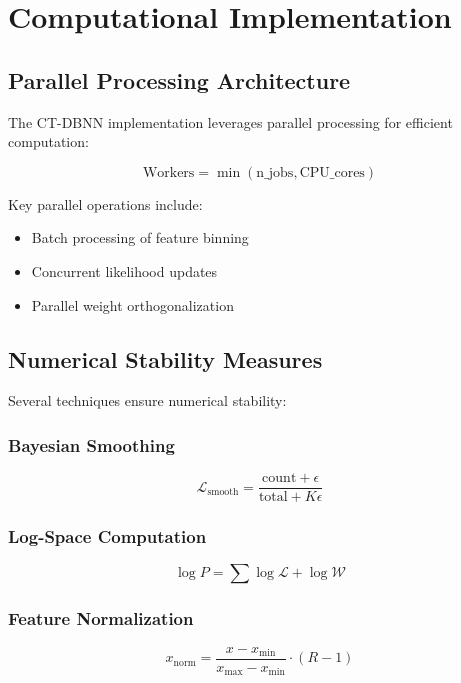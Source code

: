 \documentclass[journal]{IEEEtran}
\begin{document}
\section{Computational Implementation}

\subsection{Parallel Processing Architecture}

The CT-DBNN implementation leverages parallel processing for efficient computation:

\begin{equation}
\text{Workers} = \min(\text{n\_jobs}, \text{CPU\_cores})
\end{equation}

Key parallel operations include:
\begin{itemize}
\item Batch processing of feature binning
\item Concurrent likelihood updates
\item Parallel weight orthogonalization
\end{itemize}

\subsection{Numerical Stability Measures}

Several techniques ensure numerical stability:

\subsubsection{Bayesian Smoothing}
\begin{equation}
\mathcal{L}_{\text{smooth}} = \frac{\text{count} + \epsilon}{\text{total} + K\epsilon}
\end{equation}

\subsubsection{Log-Space Computation}
\begin{equation}
\log P = \sum \log \mathcal{L} + \log \mathcal{W}
\end{equation}

\subsubsection{Feature Normalization}
\begin{equation}
x_{\text{norm}} = \frac{x - x_{\min}}{x_{\max} - x_{\min}} \cdot (R - 1)
\end{equation}
\end{document}

